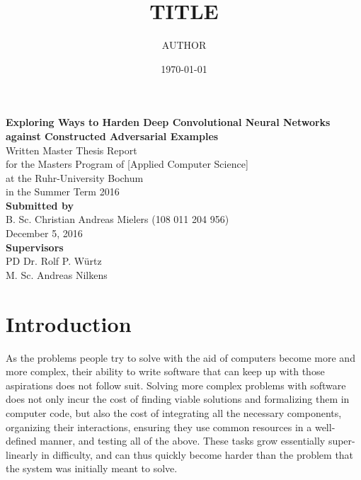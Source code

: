 \documentclass[11pt, a4paper]{article}
\title{TITLE}
\author{AUTHOR}
\date{\today}
\begin{document}
\thispagestyle{empty}

\begin{titlepage}
    \begin{center}
    \vphantom{1cm}
    \vspace{1cm}
    \huge \textbf{Exploring Ways to Harden Deep Convolutional Neural Networks against Constructed Adversarial Examples} \\
    \vspace{3cm}
    \normalsize
    Written Master Thesis Report \\
    for the Masters Program of \textcolor{AI-BLUE}{[Applied Computer Science]}\\
    at the Ruhr-University Bochum\\
    in the Summer Term 2016\\
    \vspace{3cm}
    \textbf{Submitted by}\\
    B. Sc. Christian Andreas Mielers (108 011 204 956)\\
    \vspace{1cm}
    December 5, 2016 \\
    \vspace{3cm}
    \textbf{Supervisors} \\
    PD Dr. Rolf P. Würtz \\
    M. Sc. Andreas Nilkens
    \end{center}
\end{titlepage}

\newpage
{}
\setcounter{page}{2}

\tableofcontents

\newpage
\section{Introduction}
\label{sec:introduction}

As the problems people try to solve with the aid of computers become more and more complex, their ability to write software that can keep up with those aspirations does not follow suit. Solving more complex problems with software does not only incur the cost of finding viable solutions and formalizing them in computer code, but also the cost of integrating all the necessary components, organizing their interactions, ensuring they use common resources in a well-defined manner, and testing all of the above. These tasks grow essentially super-linearly in difficulty, and can thus quickly become harder than the problem that the system was initially meant to solve.
\end{document}
